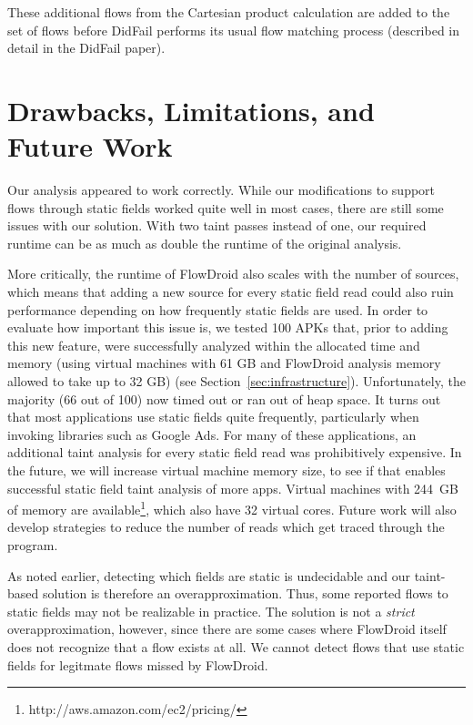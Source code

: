 These additional flows from the Cartesian product calculation are added to the set of flows before DidFail performs its usual flow matching process (described in detail in the DidFail paper).

\section{Drawbacks, Limitations, and Future Work}

Our analysis appeared to work correctly. While our modifications to support flows through static fields worked quite well in most cases, there are still some issues with our solution. With two taint passes instead of one, our required runtime can be as much as double the runtime of the original analysis. 

More critically, the runtime of FlowDroid also scales with the number of sources, which means that adding a new source for every static field read could also ruin performance depending on how frequently static fields are used. In order to evaluate how important this issue is, we tested 100 APKs that, prior to adding this new feature, were successfully analyzed within the allocated time and memory (using virtual machines with 61 GB and FlowDroid analysis memory allowed to take up to 32 GB) (see Section~\ref{sec:infrastructure}). Unfortunately, the majority (66 out of 100) now timed out or ran out of heap space. It turns out that most applications use static fields quite frequently, particularly when invoking libraries such as Google Ads. For many of these applications, an additional taint analysis for every static field read was prohibitively expensive. In the future, we will increase virtual machine memory size, to see if that enables successful static field taint analysis of more apps. Virtual machines with 244~GB of memory are available\footnote{http://aws.amazon.com/ec2/pricing/}, which also have 32 virtual cores. Future work will also develop strategies to reduce the number of reads which get traced through the program. 

As noted earlier, detecting which fields are static is undecidable and our taint-based solution is therefore an overapproximation. Thus, some reported flows to static fields may not be realizable in practice. The solution is not a \emph{strict} overapproximation, however, since there are some cases where FlowDroid itself does not recognize that a flow exists at all. We cannot detect flows that use static fields for legitmate flows missed by FlowDroid. 

